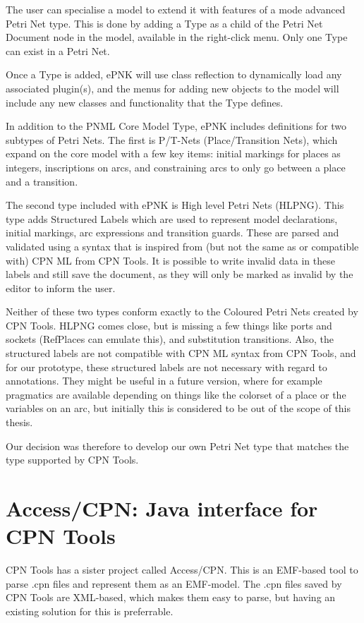 The user can specialise a model to extend it with features of a mode advanced
Petri Net type. This is done by adding a Type as a child of the Petri Net
Document node in the model, available in the right-click menu. Only one
Type can exist in a Petri Net.

Once a Type is added, ePNK will use class reflection to dynamically load
any associated plugin(s), and the menus for adding new objects to the model will
include any new classes and functionality that the Type defines.

In addition to the PNML Core Model Type, ePNK includes definitions for
two subtypes of Petri Nets. The first is P/T-Nets (Place/Transition Nets), which
expand on the core model with a few key items: initial markings for places as
integers, inscriptions on arcs, and constraining arcs to only go between a place
and a transition.

The second type included with ePNK is High level Petri Nets (HLPNG). This type
adds Structured Labels which are used to represent model declarations, initial
markings, arc expressions and transition guards.
These are parsed and validated using a syntax that is inspired from (but not the
same as or compatible with) CPN ML from CPN Tools. It is possible to write
invalid data in these labels and still save the document, as they will only be
marked as invalid by the editor to inform the user.

Neither of these two types conform exactly to the Coloured Petri Nets created by
CPN Tools. HLPNG comes close, but is missing a few things like ports and sockets
(RefPlaces can emulate this), and substitution transitions. Also, the
structured labels are not compatible with CPN ML syntax from CPN Tools, and for
our prototype, these structured labels are not necessary with regard to
annotations. They might be useful in a future version, where for example
pragmatics are available depending on things like the colorset of a place or the
variables on an arc, but initially this is considered to be out of the scope of
this thesis.

Our decision was therefore to develop our own Petri Net type that matches the
type supported by CPN Tools.

\section{Access/CPN: Java interface for CPN Tools}
CPN Tools has a sister project called Access/CPN. This is an
EMF-based tool to parse .cpn files and represent them as an
EMF-model. The .cpn files saved by CPN Tools are XML-based, which makes them
easy to parse, but having an existing solution for this is preferrable.

